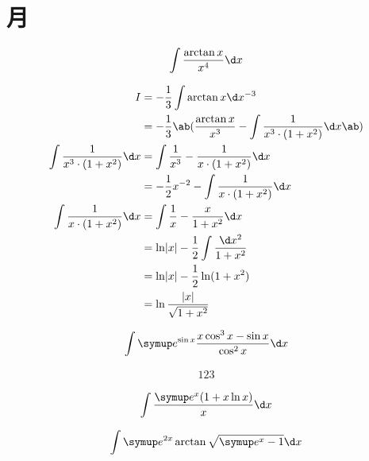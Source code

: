 \section{月}

\begin{question}
    \begin{equation*}
        \int\frac{\arctan x}{x^4} \d x
    \end{equation*}
\end{question}
\begin{solution}
    \begin{align*}
        I &= -\frac 1 3 \int \arctan x \d x^{-3}    \\
        &= -\frac 1 3 \ab( \frac{\arctan x}{x^3} - \int \frac{1}{x^3 \cdot (1 + x^2)} \d x \ab)  \\
        \int \frac{1}{x^3 \cdot (1 + x^2)} \d x &=\int \frac{1}{x^3} - \frac{1}{x \cdot (1 + x^2)} \d x \\
        &= -\frac 1 2 x^{-2} - \int \frac{1}{x \cdot (1 + x^2)} \d x    \\
        \int \frac{1}{x \cdot (1 + x^2)} \d x &= \int \frac 1 x - \frac{x}{1 + x^2} \d x    \\
        &= \ln\abs{x} - \frac 1 2 \int \frac{\d x^2}{1 + x^2}   \\
        &= \ln\abs{x} - \frac 1 2 \ln(1 + x^2)  \\
        &= \ln\frac{\abs{x}}{\sqrt{1 + x^2}}
    \end{align*}
\end{solution}

\begin{question}
    \begin{equation*}
        \int \me^{ \sin x } \frac{ x \cos^3 x - \sin x }{ \cos^2 x } \d x
    \end{equation*}
\end{question}
\begin{solution}
    \begin{align*}
        123
    \end{align*}
\end{solution}

\begin{question}
    \begin{equation*}
        \int \frac{ \me^x ( 1 + x \ln x ) }{ x } \d x
    \end{equation*}
\end{question}

\begin{question}
    \begin{equation*}
        \int \me^{2x} \arctan \sqrt{ \me^x - 1 } \d x
    \end{equation*}
\end{question}


